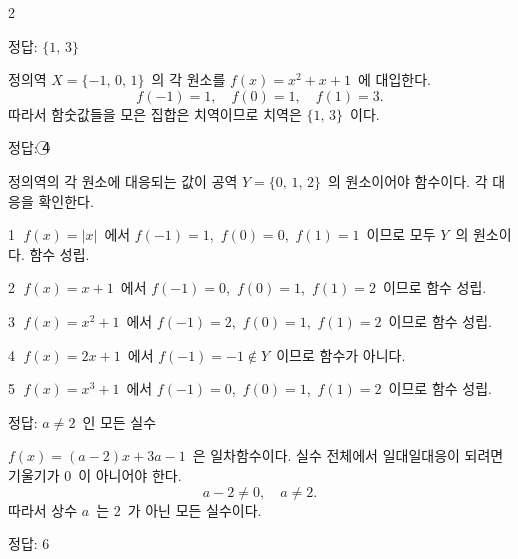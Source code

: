 \documentclass[10pt,fleqn]{article}
\begin{document}
\begin{multicols*}{2}

\begin{dmanswerbox}
정답: $\{1,\, 3\}$
\end{dmanswerbox}

정의역 $X = \{-1,\, 0,\, 1\}$\ 의 각 원소를 $f(x) = x^{2} + x + 1$\ 에 대입한다.
\[ f(-1) = 1,\quad f(0) = 1,\quad f(1) = 3. \]
따라서 함숫값들을 모은 집합은 치역이므로 치역은 $\{1,\, 3\}$\ 이다.

\begin{dmanswerbox}
정답: \textcircled{\scriptsize 4}
\end{dmanswerbox}

정의역의 각 원소에 대응되는 값이 공역 $Y = \{0,\, 1,\, 2\}$\ 의 원소이어야 함수이다. 각 대응을 확인한다.

\vspace{3mm}
\textcircled{\scriptsize 1} $f(x) = |x|$\ 에서 $f(-1) = 1$,\ $f(0) = 0$,\ $f(1) = 1$\ 이므로 모두 $Y$\ 의 원소이다. 함수 성립.

\vspace{3mm}
\textcircled{\scriptsize 2} $f(x) = x + 1$\ 에서 $f(-1) = 0$,\ $f(0) = 1$,\ $f(1) = 2$\ 이므로 함수 성립.

\vspace{3mm}
\textcircled{\scriptsize 3} $f(x) = x^{2} + 1$\ 에서 $f(-1) = 2$,\ $f(0) = 1$,\ $f(1) = 2$\ 이므로 함수 성립.

\vspace{3mm}
\textcircled{\scriptsize 4} $f(x) = 2x + 1$\ 에서 $f(-1) = -1 \notin Y$\ 이므로 함수가 아니다.

\vspace{3mm}
\textcircled{\scriptsize 5} $f(x) = x^{3} + 1$\ 에서 $f(-1) = 0$,\ $f(0) = 1$,\ $f(1) = 2$\ 이므로 함수 성립.

\begin{dmanswerbox}
정답: $a\ne 2$\ 인 모든 실수
\end{dmanswerbox}

$f(x) = (a - 2)x + 3a - 1$\ 은 일차함수이다. 실수 전체에서 일대일대응이 되려면 기울기가 $0$\ 이 아니어야 한다.
\[ a - 2 \ne 0,\quad a \ne 2. \]
따라서 상수 $a$\ 는 $2$\ 가 아닌 모든 실수이다.
\begin{dmanswerbox}
정답: $6$
\end{dmanswerbox}


\end{multicols*}
\end{document}
